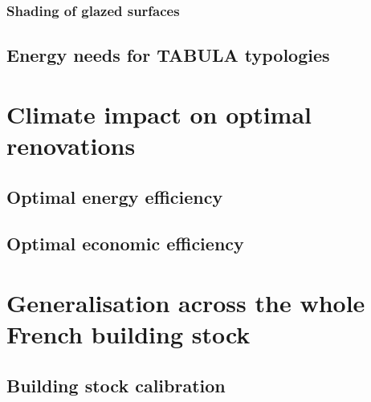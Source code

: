 \documentclass[11pt]{article}
\begin{document}

        \subsubsection{Shading of glazed surfaces} %
        \label{ssub:shading_of_glazed}
        

    \subsection{Energy needs for TABULA typologies} %
    \label{sub:energy_needs_for_tabula_typologies}
    

\section{Climate impact on optimal renovations}
\label{sec:opti}

    \subsection{Optimal energy efficiency} %
    \label{sub:optimal_energy_efficiency}
    

    \subsection{Optimal economic efficiency} %
    \label{sub:optimal_economic_efficiency}
    

\section{Generalisation across the whole French building stock}
\label{sec:generalisation}
    
    \subsection{Building stock calibration} %
    \label{sub:calibration}
    
\end{document}
